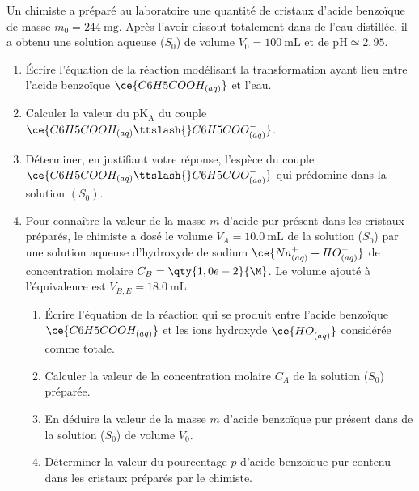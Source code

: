 Un chimiste a préparé au laboratoire une quantité de cristaux d'acide benzoïque
de masse $m_{0}=\qty{244}{\mg}$. Après l'avoir dissout totalement dans de l'eau
distillée, il a obtenu une solution aqueuse ($S_{0}$) de
volume $V_{0}=\qty{100}{\mL}$ et de $\mathrm{pH}\simeq 2,95$.
\begin{enumerate}
    \item Écrire l'équation de la réaction modélisant la transformation ayant
          lieu entre l'acide benzoïque $\ce{C6H5COOH_{(aq)}}$ et l'eau.
    \item Calculer la valeur du $\mathrm{pK_{A}}$ du couple
          $\ce{C6H5COOH_{(aq)}\ttslash{}C6H5COO^{-}_{(aq)}}$.
    \item Déterminer, en justifiant votre réponse, l'espèce du couple
          $\ce{C6H5COOH_{(aq)}\ttslash{}C6H5COO^{-}_{(aq)}}$ qui prédomine dans
          la solution $(S_{0})$.
    \item Pour connaître la valeur de la masse $m$ d'acide pur présent dans les
          cristaux préparés, le chimiste a dosé le volume
          $V_{A}=\qty{10,0}{\mL}$ de la solution ($S_{0}$) par une solution
          aqueuse d'hydroxyde de sodium $\ce{Na^{+}_{(aq)} + HO^{-}_{(aq)}}$ de
          concentration molaire $C_{B}=\qty{1,0e-2}{\M}$. Le volume ajouté à
          l'équivalence est $V_{B,E}=\qty{18,0}{\mL}$.
          \begin{enumerate}
              \item Écrire l'équation de la réaction qui se produit entre
                    l'acide benzoïque $\ce{C6H5COOH_{(aq)}}$ et les ions
                    hydroxyde $\ce{HO^{-}_{(aq)}}$ considérée comme totale.
              \item Calculer la valeur de la concentration molaire $C_{A}$ de la
                    solution ($S_{0}$) préparée.
              \item En déduire la valeur de la masse $m$ d'acide benzoïque pur
                    présent dans de la solution ($S_{0}$) de volume $V_{0}$.
              \item Déterminer la valeur du pourcentage $p$ d'acide benzoïque
                    pur contenu dans les cristaux préparés par le chimiste.
          \end{enumerate}
\end{enumerate}

